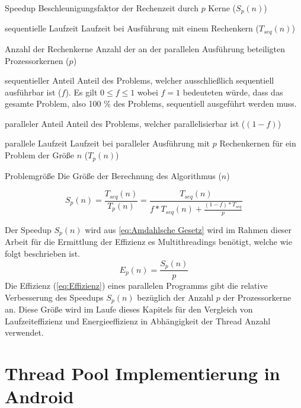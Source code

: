 \begin{aligneddescription}
\item[Speedup] Beschleunigungsfaktor der Rechenzeit durch $p$ Kerne ($S_{p}(n)$)
\item [sequentielle Laufzeit] Laufzeit bei Ausführung mit einem Rechenkern ($T_{seq}(n)$)
\item[Anzahl der Rechenkerne] Anzahl der an der parallelen Ausführung beteiligten Prozessorkernen ($p$)
\item[sequentieller Anteil] Anteil des Problems, welcher ausschließlich sequentiell ausführbar ist ($f$). Es gilt $0\leq f \leq 1$ wobei $f = 1$ bedeuteten würde, dass das gesamte Problem, also 100 \% des Problems, sequentiell ausgeführt werden muss.
\item[paralleler Anteil] Anteil des Problems, welcher parallelisierbar ist ($(1-f)$)
\item[parallele Laufzeit] Laufzeit bei paralleler Ausführung mit $p$ Rechenkernen für ein Problem der Größe $n$ ($T_{p}(n)$)
\item[Problemgröße] Die Größe der Berechnung des Algorithmus ($n$)
\end{aligneddescription}
\begin{equation}\label{eq:Amdahlsche Gesetz}
S_{p}(n)=\frac{T_{seq}(n)}{T_{p}(n)} =
\frac{T_{seq}(n)}{f*T_{seq}(n) + \frac{ (1-f)*T_{seq} }{p}}
\end{equation}
\cite[317]{parallelBook}

Der Speedup $S_{ p }(n)$ wird aus \autoref{eq:Amdahlsche Gesetz} wird im Rahmen dieser Arbeit für die Ermittlung der Effizienz es Multithreadings benötigt, welche wie folgt beschrieben ist. 
\begin{equation}\label{eq:Effizienz}
E_{ p }(n) =\frac{ S_{ p }(n) }{p}
\end{equation}
\cite[316]{parallelBook}
Die Effizienz (\autoref{eq:Effizienz}) eines parallelen Programms gibt die relative Verbesserung des Speedups $S_{ p }(n)$ bezüglich der Anzahl $p$ der Prozessorkerne an. Diese Größe wird im Laufe dieses Kapitels für den Vergleich von Laufzeiteffizienz und Energieeffizienz in Abhängigkeit der Thread Anzahl verwendet.

\section{Thread Pool Implementierung in Android}

